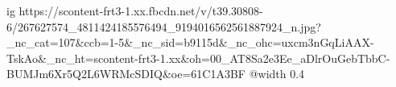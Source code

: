  
 
 
 
 

\ifcmt
  ig https://scontent-frt3-1.xx.fbcdn.net/v/t39.30808-6/267627574_4811424185576494_9194016562561887924_n.jpg?_nc_cat=107&ccb=1-5&_nc_sid=b9115d&_nc_ohc=uxcm3nGqLiAAX-TskAo&_nc_ht=scontent-frt3-1.xx&oh=00_AT8Sa2e3Ee_aDlrOuGebTbbC-BUMJm6Xr5Q2L6WRMcSDIQ&oe=61C1A3BF
  @width 0.4
\fi
